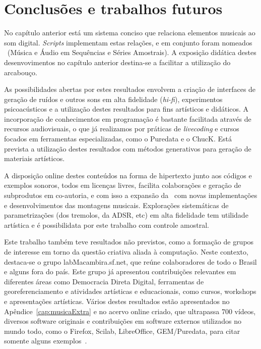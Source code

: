 \chapter{Conclusões e trabalhos futuros} %
\label{cap:conclusao}

No capítulo anterior está um sistema conciso
que relaciona elementos musicais ao som digital. \emph{Scripts} 
implementam estas relações, e em conjunto foram nomeados \massa\ (Música
e Áudio em Sequências e Séries Amostrais). 
A exposição didática destes desenvovimentos no
capítulo anterior destina-se a facilitar a utilização
do arcabouço.

As possibilidades abertas por estes resultados envolvem a criação de interfaces de geração de ruídos e outros sons em alta fidelidade (\emph{hi-fi}), experimentos psicoacústicos e a utilização destes resultados para fins artísticos e didáticos. A incorporação de conhecimentos
em programação é bastante facilitada através de recursos audiovisuais, o que já realizamos por práticas de \emph{livecoding} e cursos focados em ferramentas especializadas, como o Puredata e o ChucK.
Está prevista a utilização destes resultados com
métodos generativos para geração de materiais artísticos.

A disposição online destes conteúdos na forma de hipertexto junto aos códigos e exemplos sonoros, todos em licenças livres, facilita colaborações e geração de subprodutos em co-autoria, e com isso a expansão da \massa\ com novas implementações e desenvolvimentos das montagens musicais.
Explorações sistemáticas de parametrizações (dos tremolos, da ADSR, etc) em alta fidelidade tem utilidade artística e é possibilidata por este trabalho com controle amostral. 

Este trabalho também teve resultados não previstos, como a formação de grupos
de interesse em torno da questão criativa aliada à computação.
Neste contexto, destaca-se o grupo
labMacambira.sf.net, que reúne colaboradores de todo o Brasil e alguns fora do país.
Este grupo
já apresentou contribuições relevantes em diferentes áreas
como Democracia Direta Digital, ferramentas de georeferenciamento e
atividades artísticas e educacionais, como cursos, workshops e apresentações artísticas. Vários destes resultados estão apresentados no Apêndice~\ref{cap:musicaExtra} e no acervo online criado, que ultrapassa 700 vídeos, diversos software originais e contribuições em software externos utilizados no mundo todo, como o Firefox, Scilab, LibreOffice, GEM/Puredata, para citar somente alguns exemplos~\cite{siteLM,wikiLM,vimeoLM}.








